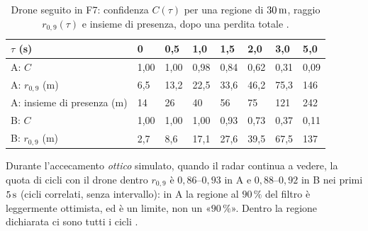 \begin{table}[H]\centering\footnotesize
\caption{Drone seguito in F7: confidenza $C(\tau)$ per una regione di $30\unita{m}$, raggio $r_{0,9}(\tau)$ e insieme di presenza, dopo una perdita totale .}\label{tab:vo-curva-f7}
\begin{tabularx}{\linewidth}{@{}>{\RaggedRight\arraybackslash}p{4.2cm}LLLLLLL@{}}
\toprule
$\tau$ (s) & 0 & 0,5 & 1,0 & 1,5 & 2,0 & 3,0 & 5,0\\
\midrule
A: $C$ & 1,00 & 1,00 & 0,98 & 0,84 & 0,62 & 0,31 & 0,09\\
A: $r_{0,9}$ (m) & 6,5 & 13,2 & 22,5 & 33,6 & 46,2 & 75,3 & 146\\
A: insieme di presenza (m) & 14 & 26 & 40 & 56 & 75 & 121 & 242\\
B: $C$ & 1,00 & 1,00 & 1,00 & 0,93 & 0,73 & 0,37 & 0,11\\
B: $r_{0,9}$ (m) & 2,7 & 8,6 & 17,1 & 27,6 & 39,5 & 67,5 & 137\\
\bottomrule
\end{tabularx}
\end{table}
Durante l'accecamento \emph{ottico} simulato, quando il radar continua a vedere, la quota di cicli con il drone dentro $r_{0,9}$ è $0{,}86$--$0{,}93$ in A e $0{,}88$--$0{,}92$ in B nei primi $5\,\mathrm{s}$ (cicli correlati, senza intervallo): in A la regione al $90\,\%$ del filtro è leggermente ottimista, ed è un limite, non un «$90\,\%$». Dentro la regione dichiarata ci sono tutti i cicli .

